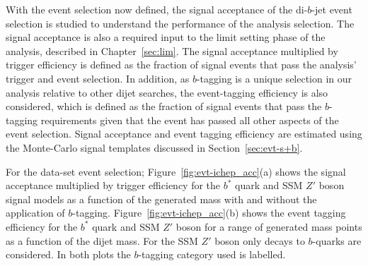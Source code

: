 With the event selection now defined,
the signal acceptance of the di-$b$-jet event selection is studied
to understand the performance of the analysis selection.
The signal acceptance is also a required input to the limit setting phase of the analysis, described in Chapter~\ref{sec:lim}.
The signal acceptance multiplied by trigger efficiency is defined as the 
fraction of signal events that pass the analysis' trigger and event selection.
In addition, as $b$-tagging is a unique selection in our analysis relative to other dijet searches,
the event-tagging efficiency is also considered, which is defined as the fraction of signal events that pass
the $b$-tagging requirements given that the event has passed all other aspects of the event selection.
Signal acceptance and event tagging efficiency are estimated using the
Monte-Carlo signal templates discussed in Section~\ref{sec:evt-s+b}.

\newpage 
For the \summer{} data-set event selection;
Figure~\ref{fig:evt-ichep_acc}(a) shows the signal acceptance multiplied by trigger efficiency
for the $b^*$ quark and SSM $Z'$ boson signal models
as a function of the generated mass
with and without the application of $b$-tagging.
Figure~\ref{fig:evt-ichep_acc}(b) shows the event tagging efficiency
for the $b^*$ quark and SSM $Z'$ boson for a range of generated mass points
as a function of the dijet mass.
For the SSM $Z'$ boson only decays to $b$-quarks are considered.
In both plots the $b$-tagging category used is labelled.

